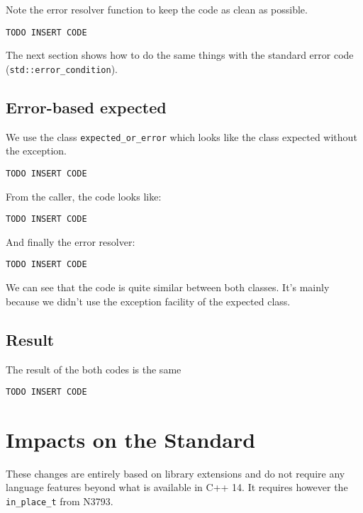 \documentclass[a4paper,10pt]{article}
\newcommand{\cpp}[1]{\lstinline{#1}}
\begin{document}
Note the error resolver function to keep the code as clean as possible.

\begin{lstlisting}
TODO INSERT CODE
\end{lstlisting}

The next section shows how to do the same things with the standard error code (\cpp{std::error_condition}).

\subsection{Error-based expected}

We use the class \cpp{expected_or_error} which looks like the class expected without the exception.

\begin{lstlisting}
TODO INSERT CODE
\end{lstlisting}

From the caller, the code looks like:

\begin{lstlisting}
TODO INSERT CODE
\end{lstlisting}

And finally the error resolver:

\begin{lstlisting}
TODO INSERT CODE
\end{lstlisting}

We can see that the code is quite similar between both classes. It's mainly because we didn't use the exception facility of the expected class.

\subsection{Result}

The result of the both codes is the same 

\begin{lstlisting}
TODO INSERT CODE
\end{lstlisting}

\section{Impacts on the Standard}

These changes are entirely based on library extensions and do not require any language features beyond what is available in C++ 14. It requires however the \cpp{in_place_t} from N3793.
\end{document}

